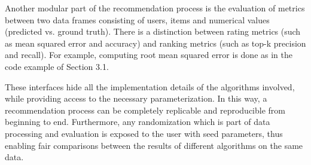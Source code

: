 Another modular part of the recommendation process is the evaluation of metrics between two data frames consisting of users, items and numerical values 
(predicted vs. ground truth). There is a distinction between rating metrics (such as mean squared error and accuracy) and ranking metrics 
(such as top-k precision and recall). For example, computing root mean squared error is done 
as in the code example of Section 3.1.   
 
These interfaces hide all the implementation details of the algorithms involved, while providing access to the necessary parameterization.
In this way, a recommendation process can be completely replicable and reproducible from beginning to end. Furthermore, any randomization 
which is part of data processing and evaluation is exposed to the user with seed parameters, thus enabling fair comparisons between the results of different algorithms
on the same data. 

